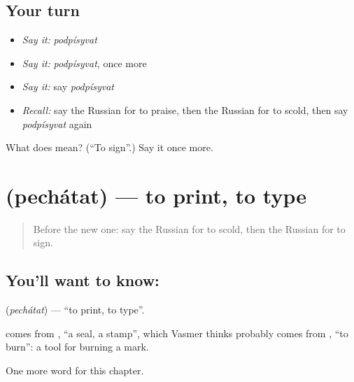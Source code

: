 \subsection*{Your turn}
\begin{itemize}
\raggedright
  \item \emph{Say it:} \emph{podpísyvat}
  \item \emph{Say it:} \emph{podpísyvat}, once more
  \item \emph{Say it:} say \emph{podpísyvat}
  \item \emph{Recall:} say the Russian for to praise, then the Russian for to scold, then say \emph{podpísyvat} again
\end{itemize}

\begin{tcolorbox}[breakable,colback=teal!4,colframe=teal!35!black,title={Before you move on}]
What does  mean? (\textquotedblleft{}To sign\textquotedblright{}.) Say it once more.
\end{tcolorbox}
\section[\texorpdfstring{\ru{печатать} (pechátat)}{печатать (pechátat)}]{ (pechátat) — to print, to type}

\label{lesson:RU-C145-pechatat}



\begin{quote}
Before the new one: say the Russian for to scold, then the Russian for to sign.
\end{quote}

\subsection*{You'll want to know: }
\textbf{} (\emph{pechátat}) — \textquotedblleft{}to print, to type\textquotedblright{}.

\begin{cousinweb}
\textbf{} comes from \emph{}, \textquotedblleft{}a seal, a stamp\textquotedblright{}, which Vasmer thinks probably comes from \emph{}, \textquotedblleft{}to burn\textquotedblright{}: a tool for burning a mark.
\end{cousinweb}

\begin{grammarlens}[title={What you've built}]
One more word for this chapter.
\end{grammarlens}

